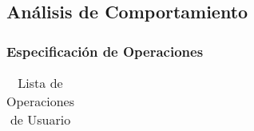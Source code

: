 \subsection{Análisis de Comportamiento}
\subsubsection{Especificación de Operaciones}
\begin{table}[H]
    \centering
    \caption{Lista de Operaciones de Usuario}
    \vspace{10pt}
    \begin{tabular}{| p{0.4\linewidth} | p{0.4\linewidth} |}
        \hline
	
        \hline
    \end{tabular}    
    
    \label{table:1}
\end{table}


